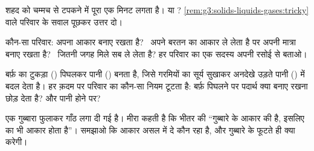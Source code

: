 \begin{exercise}[$\star$]\label{exo:g3:solids-liquids-gases:8}
शहद को चम्मच से टपकने में पूरा एक मिनट लगता है।  या ?
\cref{rem:g3:solids-liquids-gases:tricky} वाले परिवार के सवाल पूछकर
उत्तर दो।
\end{exercise}

\begin{exercise}[$\star$]\label{exo:g3:solids-liquids-gases:9}
कौन-सा परिवार: अपना आकार बनाए रखता है? \ अपने बरतन का आकार ले लेता
है पर अपनी मात्रा बनाए रखता है? \ जितनी जगह मिले सब ले लेता है? हर
परिवार का एक सदस्य अपनी रसोई से बताओ।
\end{exercise}

\begin{exercise}[$\star\star$]\label{exo:g3:solids-liquids-gases:10}
बर्फ़ का टुकड़ा () पिघलकर पानी () बनता है, जिसे गरमियों का
सूर्य सुखाकर अनदेखे उड़ते पानी () में बदल देता है। हर क़दम पर
परिवार का कौन-सा नियम टूटता है: बर्फ़ पिघलने पर पदार्थ क्या बनाए रखना
छोड़ देता है? और पानी  होने पर?
\end{exercise}

\begin{exercise}[$\star\star$]\label{exo:g3:solids-liquids-gases:11}
एक गुब्बारा फुलाकर गाँठ लगा दी गई है। मीरा कहती है कि भीतर की 
``गुब्बारे के आकार की है, इसलिए  का भी आकार होता है''। समझाओ कि
आकार असल में दे कौन रहा है, और गुब्बारे के फूटते ही  क्या करेगी।
\end{exercise}
